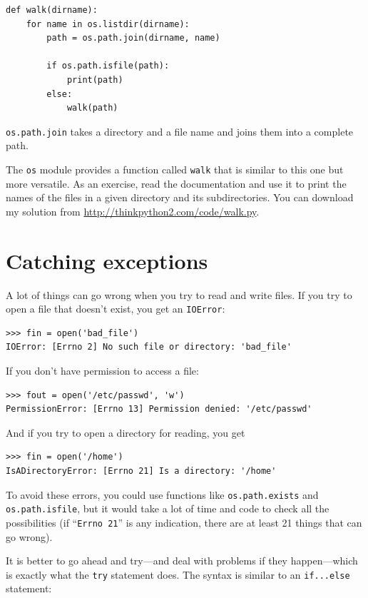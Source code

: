 \documentclass[10pt]{book}
\begin{document}
\begin{verbatim}
def walk(dirname):
    for name in os.listdir(dirname):
        path = os.path.join(dirname, name)

        if os.path.isfile(path):
            print(path)
        else:
            walk(path)
\end{verbatim}
%
{\tt os.path.join} takes a directory and a file name and joins
them into a complete path.  

The {\tt os} module provides a function called {\tt walk} that is
similar to this one but more versatile.  As an exercise, read the
documentation and use it to print the names of the files in a given
directory and its subdirectories.  You can download my solution from
\url{http://thinkpython2.com/code/walk.py}.


\section{Catching exceptions}
\label{catch}

A lot of things can go wrong when you try to read and write
files.  If you try to open a file that doesn't exist, you get an
{\tt IOError}:

\begin{verbatim}
>>> fin = open('bad_file')
IOError: [Errno 2] No such file or directory: 'bad_file'
\end{verbatim}
%
If you don't have permission to access a file:

\begin{verbatim}
>>> fout = open('/etc/passwd', 'w')
PermissionError: [Errno 13] Permission denied: '/etc/passwd'
\end{verbatim}
%
And if you try to open a directory for reading, you get

\begin{verbatim}
>>> fin = open('/home')
IsADirectoryError: [Errno 21] Is a directory: '/home'
\end{verbatim}
%
To avoid these errors, you could use functions like {\tt os.path.exists}
and {\tt os.path.isfile}, but it would take a lot of time and code
to check all the possibilities (if ``{\tt Errno 21}'' is any
indication, there are at least 21 things that can go wrong).

It is better to go ahead and try---and deal with problems if they
happen---which is exactly what the {\tt try} statement does.  The
syntax is similar to an {\tt if...else} statement:
\end{document}
